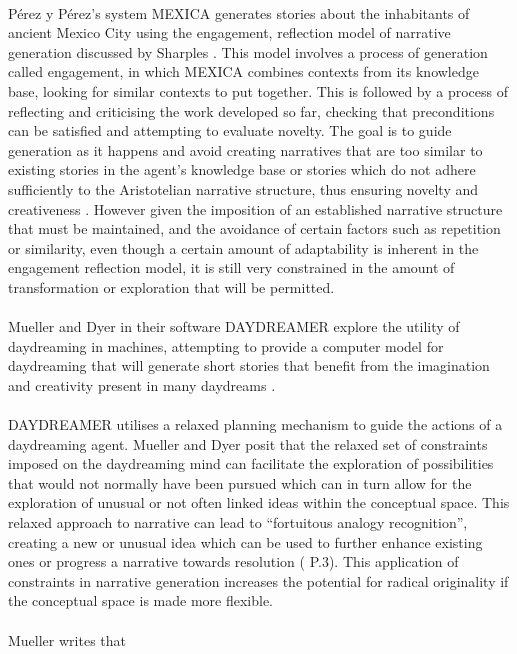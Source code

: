 \documentclass[letterpaper]{article}
\begin{document}
\\P\'erez y P\'erez's system MEXICA \cite{Perez2015} generates stories about the inhabitants of ancient Mexico City using the engagement, reflection model  of narrative generation discussed by Sharples \cite{Sharples96anaccount}. This model involves a process of generation called engagement, in which MEXICA combines contexts from its knowledge base, looking for similar contexts to put together. This is followed by a process of reflecting and criticising the work developed so far, checking that preconditions can be satisfied and attempting to evaluate novelty. The goal is to guide generation as it happens and avoid creating narratives that are too similar to existing stories in the agent's knowledge base or stories which do not adhere sufficiently to the Aristotelian narrative structure, thus ensuring novelty and creativeness \cite{Perez2015,PEREZYPEREZ200415}. However given the imposition of an established narrative structure that must be maintained, and the avoidance of certain factors such as repetition or similarity, even though a certain amount of adaptability is inherent in the engagement reflection model, it is still very constrained in the amount of transformation or exploration that will be permitted.\\
\\Mueller and Dyer in their software DAYDREAMER explore the utility of daydreaming in machines, attempting to provide a computer model for daydreaming that will generate short stories that benefit from the imagination and creativity present in many daydreams \cite{Mueller1985}.\\
\\DAYDREAMER utilises a relaxed planning mechanism to guide the actions of a daydreaming agent. Mueller and Dyer posit that the relaxed set of constraints imposed on the daydreaming mind can facilitate the exploration of possibilities that would not normally have been pursued which can in turn allow for the exploration of unusual or not often linked ideas within the conceptual space. This relaxed approach to narrative can lead to \enquote{fortuitous analogy recognition}, creating a new or unusual idea which can be used to further enhance existing ones or progress a narrative towards resolution (\citeauthor{Mueller1985}  \citeyear{Mueller1985} P.3). This application of constraints in narrative generation increases the potential for radical originality if the conceptual space is made more flexible.\\ 
\\Mueller writes that
\end{document}
